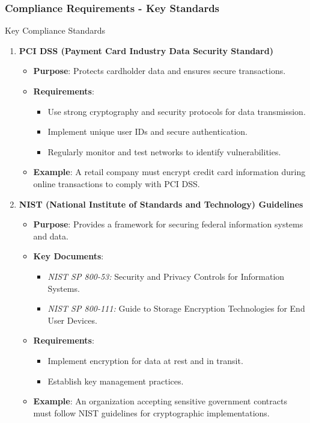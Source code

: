 \documentclass{beamer}
\begin{document}
\begin{frame}[fragile]
  \frametitle{Compliance Requirements - Key Standards}
  \begin{block}{Key Compliance Standards}
    \begin{enumerate}
      \item \textbf{PCI DSS (Payment Card Industry Data Security Standard)}
      \begin{itemize}
        \item \textbf{Purpose}: Protects cardholder data and ensures secure transactions.
        \item \textbf{Requirements}:
        \begin{itemize}
          \item Use strong cryptography and security protocols for data transmission.
          \item Implement unique user IDs and secure authentication.
          \item Regularly monitor and test networks to identify vulnerabilities.
        \end{itemize}
        \item \textbf{Example}: A retail company must encrypt credit card information during online transactions to comply with PCI DSS.
      \end{itemize}
    
      \item \textbf{NIST (National Institute of Standards and Technology) Guidelines}
      \begin{itemize}
        \item \textbf{Purpose}: Provides a framework for securing federal information systems and data.
        \item \textbf{Key Documents}:
        \begin{itemize}
          \item \textit{NIST SP 800-53:} Security and Privacy Controls for Information Systems.
          \item \textit{NIST SP 800-111:} Guide to Storage Encryption Technologies for End User Devices.
        \end{itemize}
        \item \textbf{Requirements}:
        \begin{itemize}
          \item Implement encryption for data at rest and in transit.
          \item Establish key management practices.
        \end{itemize}
        \item \textbf{Example}: An organization accepting sensitive government contracts must follow NIST guidelines for cryptographic implementations.
      \end{itemize}
    \end{enumerate}
  \end{block}
\end{frame}
\end{document}
